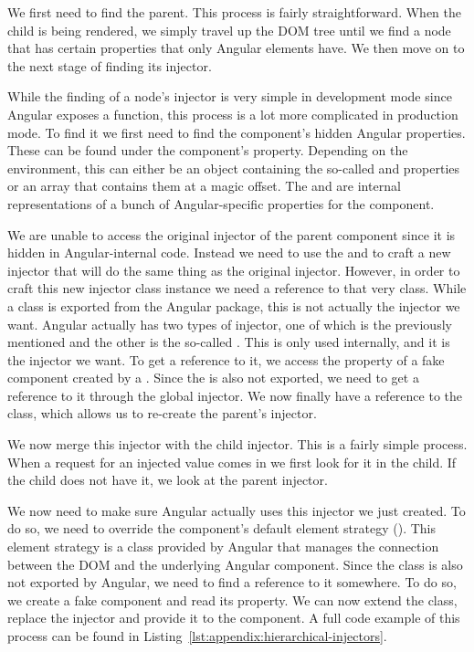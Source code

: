 {	We first need to find the parent. This process is fairly straightforward. When the child is being rendered, we simply travel up the DOM tree until we find a node that has certain properties that only Angular elements have. We then move on to the next stage of finding its injector.

	While the finding of a node's injector is very simple in development mode since Angular exposes a  function, this process is a lot more complicated in production mode. To find it we first need to find the component's hidden Angular properties. These can be found under the component's  property. Depending on the environment, this can either be an object containing the so-called  and  properties or an array that contains them at a magic offset. The  and  are internal representations of a bunch of Angular-specific properties for the component.

	We are unable to access the original injector of the parent component since it is hidden in Angular-internal code. Instead we need to use the  and  to craft a new injector that will do the same thing as the original injector. However, in order to craft this new injector class instance we need a reference to that very class. While a  class is exported from the Angular package, this is not actually the injector we want. Angular actually has two types of injector, one of which is the previously mentioned  and the other is the so-called . This  is only used internally, and it is the injector we want. To get a reference to it, we access the  property of a fake component created by a . Since the  is also not exported, we need to get a reference to it through the global injector. We now finally have a reference to the  class, which allows us to re-create the parent's injector.

	We now merge this injector with the child injector. This is a fairly simple process. When a request for an injected value comes in we first look for it in the child. If the child does not have it, we look at the parent injector.

	We now need to make sure Angular actually uses this injector we just created. To do so, we need to override the component's default element strategy (). This element strategy is a class provided by Angular that manages the connection between the DOM and the underlying Angular component. Since the  class is also not exported by Angular, we need to find a reference to it somewhere. To do so, we create a fake component and read its  property. We can now extend the class, replace the injector and provide it to the component. A full code example of this process can be found in Listing~\ref{lst:appendix:hierarchical-injectors}.
}

